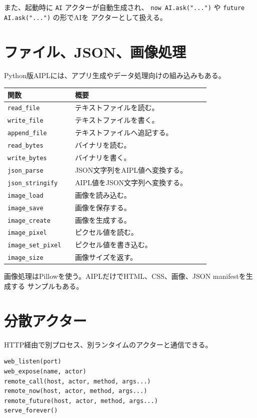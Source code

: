 \documentclass[11pt,a4paper,uplatex,dvipdfmx]{jsarticle}
\begin{document}
また、起動時に \texttt{AI} アクターが自動生成され、
\texttt{now AI.ask("...")} や \texttt{future AI.ask("...")} の形でAIを
アクターとして扱える。

\section{ファイル、JSON、画像処理}

Python版AIPLには、アプリ生成やデータ処理向けの組み込みもある。

\begin{longtable}{p{0.30\linewidth}p{0.60\linewidth}}
\toprule
関数 & 概要 \\
\midrule
\texttt{read\_file} & テキストファイルを読む。 \\
\texttt{write\_file} & テキストファイルを書く。 \\
\texttt{append\_file} & テキストファイルへ追記する。 \\
\texttt{read\_bytes} & バイナリを読む。 \\
\texttt{write\_bytes} & バイナリを書く。 \\
\texttt{json\_parse} & JSON文字列をAIPL値へ変換する。 \\
\texttt{json\_stringify} & AIPL値をJSON文字列へ変換する。 \\
\texttt{image\_load} & 画像を読み込む。 \\
\texttt{image\_save} & 画像を保存する。 \\
\texttt{image\_create} & 画像を生成する。 \\
\texttt{image\_pixel} & ピクセル値を読む。 \\
\texttt{image\_set\_pixel} & ピクセル値を書き込む。 \\
\texttt{image\_size} & 画像サイズを返す。 \\
\bottomrule
\end{longtable}

画像処理はPillowを使う。AIPLだけでHTML、CSS、画像、JSON manifestを生成する
サンプルもある。

\section{分散アクター}

HTTP経由で別プロセス、別ランタイムのアクターと通信できる。

\begin{lstlisting}[style=aipl]
web_listen(port)
web_expose(name, actor)
remote_call(host, actor, method, args...)
remote_now(host, actor, method, args...)
remote_future(host, actor, method, args...)
serve_forever()
\end{lstlisting}
\end{document}
